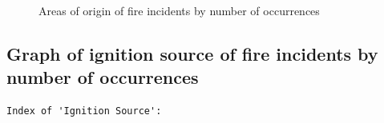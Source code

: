 \documentclass[
  letterpaper,
  DIV=11,
  numbers=noendperiod]{scrartcl}
\begin{document}
\begin{figure}


\caption{\label{fig-origin}Areas of origin of fire incidents by number
of occurrences}

\end{figure}%

\newpage

\subsection{Graph of ignition source of fire incidents by number of
occurrences}\label{sec-source-fig}

\begin{verbatim}
Index of 'Ignition Source':
\end{verbatim}
\end{document}
